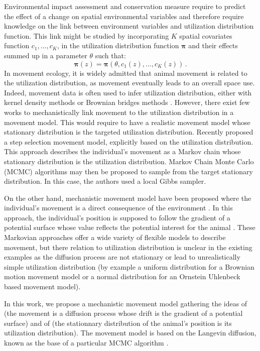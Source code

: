 \documentclass[10pt,a4paper, draft]{article}
\newcommand{\ud}{\boldsymbol{\pi}}
\begin{document}
Environmental impact assessment and conservation measure require to predict the effect of a change on spatial environmental variables and therefore require knowledge on the link between environment variables and utilization distribution function. This link might be studied by incorporating  $K$ spatial covariates function $c_1, \dots, c_K$, in the utilization distribution function $\ud$  and their effects summed up in a parameter $\theta$ such that: 
\begin{equation}
\label{eq:ParUD}
\ud(z) = \ud (\theta, c_1(z), \dots, c_K(z))\,.
\end{equation}
In movement ecology, it is widely admitted that animal movement is related to the utilization distribution, as movement eventually leads to an overall space use. Indeed, movement data is often used to infer utilization distribution, either with kernel density methods \citep{worton1989kernel, fleming2015rigorous} or Brownian bridges methods \citep{horne2007analyzing}. However, there exist few works to mechanistically link movement to the utilization distribution in a movement model. This would require to have a realistic movement model whose stationary distribution is the targeted utilization distribution.
Recently  \citet{michelot2017linking} proposed a step selection movement model, explicitly based on the utilization distribution. This approach describes the individual's movement as a Markov chain whose stationary distribution is the utilization distribution. Markov Chain Monte Carlo (MCMC) algorithms may then be proposed to sample from the target stationary distribution. In this case, the authors used a local Gibbs sampler.

On the other hand, mechanistic movement model have been proposed where the individual's movement is a direct consequence of the environment \citep{brillinger2010handbook}. In this approach, the individual's position is supposed to follow the gradient of a potential surface whose value reflects the potential interest for the animal \citep{preisler2013analyzing}. These Markovian approaches offer a wide variety of flexible models to describe movement, but there relation to utilization distribution is unclear in the existing examples as the diffusion process are not stationary \citep{gloaguen2017stochastic}  or lead to unrealistically simple utilization distribution (by example a uniform distribution for a Brownian motion movement model or a normal distribution for an Ornstein Uhlenbeck based movement model).

In this work, we propose a mechanistic movement model gathering the ideas of \citet{brillinger2010handbook} (the movement is a diffusion process whose drift is the gradient of a potential surface) and of \citet{michelot2017linking} (the stationnary distribution of the animal's position is its  utilization distribution). The movement model is based on the Langevin diffusion, known as the base of a particular MCMC algorithm \citep{roberts1998optimal}.
\end{document}
